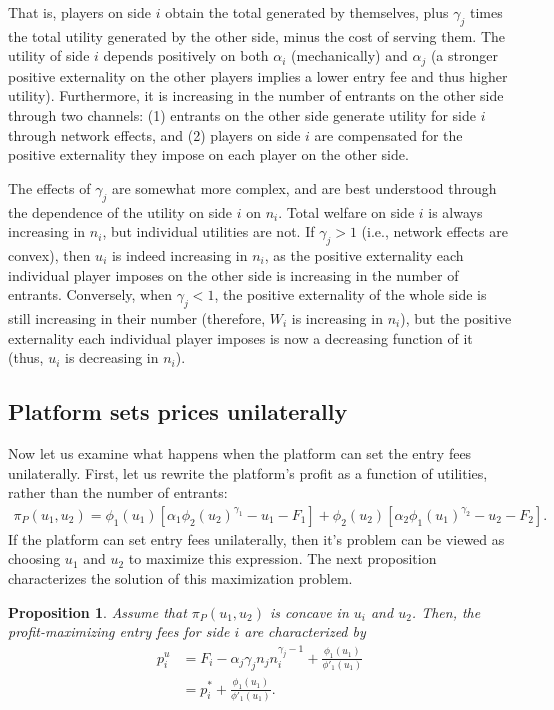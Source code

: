 \documentclass[a4paper]{article}
\newtheorem{proposition}{Proposition}
\begin{document}
That is, players on side $i$ obtain the total generated by themselves, plus $\gamma_j$ times the total utility generated by the other side, minus the cost of serving them.
The utility of side $i$ depends positively on both $\alpha_i$ (mechanically) and $\alpha_j$ (a stronger positive externality on the other players implies a lower entry fee and thus higher utility).
Furthermore, it is increasing in the number of entrants on the other side through two channels: (1) entrants on the other side generate utility for side $i$ through network effects, and (2) players on side $i$ are compensated for the positive externality they impose on each player on the other side.

The effects of $\gamma_j$ are somewhat more complex, and are best understood through the dependence of the utility on side $i$ on $n_i$.
Total welfare on side $i$ is always increasing in $n_i$, but individual utilities are not.
If $\gamma_j > 1$ (i.e., network effects are convex), then $u_i$ is indeed increasing in $n_i$, as the positive externality each individual player imposes on the other side is increasing in the number of entrants.
Conversely, when $\gamma_j < 1$, the positive externality of the whole side is still increasing in their number (therefore, $W_i$ is increasing in $n_i$), but the positive externality each individual player imposes is now a decreasing function of it (thus, $u_i$ is decreasing in $n_i$).

\subsection{Platform sets prices unilaterally}

Now let us examine what happens when the platform can set the entry fees unilaterally.
First, let us rewrite the platform's profit as a function of utilities, rather than the number of entrants:
\begin{align*}
    \pi_P(u_1, u_2) = \phi_1(u_1) [\alpha_1 \phi_2(u_2) ^ {\gamma_1} - u_1 - F_1] + \phi_2(u_2) [\alpha_2 \phi_1(u_1) ^ {\gamma_2} - u_2 - F_2].
\end{align*}
If the platform can set entry fees unilaterally, then it's problem can be viewed as choosing $u_1$ and $u_2$ to maximize this expression.
The next proposition characterizes the solution of this maximization problem.
\begin{proposition}
    \label{prop:unilateral_entry_fees}
    Assume that $\pi_P(u_1, u_2)$ is concave in $u_i$ and $u_2$.
    Then, the profit-maximizing entry fees for side $i$ are characterized by
    \begin{align}
        p_i^u &= F_i - \alpha_j \gamma_j n_j n_i^{\gamma_j - 1} + \frac{\phi_1(u_1)}{\phi'_1(u_1)}  \label{eq:unilateral_entry_fees} \\
              &= p_i^* + \frac{\phi_1(u_1)}{\phi'_1(u_1)}.  \nonumber
    \end{align}
\end{proposition}
\end{document}
